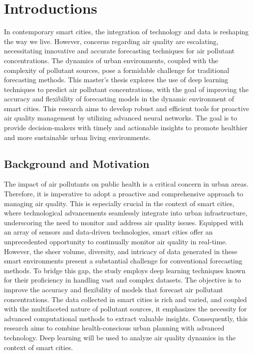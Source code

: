 \chapter*{Introductions}

In contemporary smart cities, the integration of technology and data is reshaping the way we live. However, concerns regarding air quality are escalating, necessitating innovative and accurate forecasting techniques for air pollutant concentrations. The dynamics of urban environments, coupled with the complexity of pollutant sources, pose a formidable challenge for traditional forecasting methods. This master's thesis explores the use of deep learning techniques to predict air pollutant concentrations, with the goal of improving the accuracy and flexibility of forecasting models in the dynamic environment of smart cities. This research aims to develop robust and efficient tools for proactive air quality management by utilizing advanced neural networks. The goal is to provide decision-makers with timely and actionable insights to promote healthier and more sustainable urban living environments.

\section*{Background and Motivation}

The impact of air pollutants on public health is a critical concern in urban areas. Therefore, it is imperative to adopt a proactive and comprehensive approach to managing air quality. This is especially crucial in the context of smart cities, where technological advancements seamlessly integrate into urban infrastructure, underscoring the need to monitor and address air quality issues. Equipped with an array of sensors and data-driven technologies, smart cities offer an unprecedented opportunity to continually monitor air quality in real-time. However, the sheer volume, diversity, and intricacy of data generated in these smart environments present a substantial challenge for conventional forecasting methods. To bridge this gap, the study employs deep learning techniques known for their proficiency in handling vast and complex datasets. The objective is to improve the accuracy and flexibility of models that forecast air pollutant concentrations. The data collected in smart cities is rich and varied, and coupled with the multifaceted nature of pollutant sources, it emphasizes the necessity for advanced computational methods to extract valuable insights. Consequently, this research aims to combine health-conscious urban planning with advanced technology. Deep learning will be used to analyze air quality dynamics in the context of smart cities.

